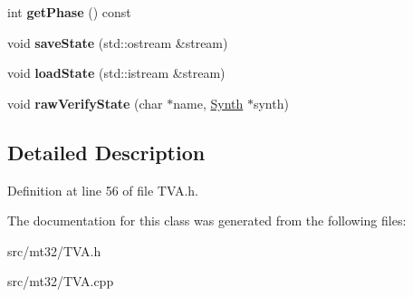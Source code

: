 \begin{DoxyCompactItemize}
\item 
\hypertarget{classMT32Emu_1_1TVA_a273d3a2a8000f47c4e9ee43832e8316a}{int {\bfseries get\-Phase} () const }\label{classMT32Emu_1_1TVA_a273d3a2a8000f47c4e9ee43832e8316a}

\item 
\hypertarget{classMT32Emu_1_1TVA_ad59092d645a1d22ce4d4d4860639a346}{void {\bfseries save\-State} (std\-::ostream \&stream)}\label{classMT32Emu_1_1TVA_ad59092d645a1d22ce4d4d4860639a346}

\item 
\hypertarget{classMT32Emu_1_1TVA_a0329b35f232a3517a1702e88b8c3c696}{void {\bfseries load\-State} (std\-::istream \&stream)}\label{classMT32Emu_1_1TVA_a0329b35f232a3517a1702e88b8c3c696}

\item 
\hypertarget{classMT32Emu_1_1TVA_ab4d75087deb81f3aa794b1709eb107d5}{void {\bfseries raw\-Verify\-State} (char $\ast$name, \hyperlink{classMT32Emu_1_1Synth}{Synth} $\ast$synth)}\label{classMT32Emu_1_1TVA_ab4d75087deb81f3aa794b1709eb107d5}

\end{DoxyCompactItemize}


\subsection{Detailed Description}


Definition at line 56 of file T\-V\-A.\-h.



The documentation for this class was generated from the following files\-:\begin{DoxyCompactItemize}
\item 
src/mt32/T\-V\-A.\-h\item 
src/mt32/T\-V\-A.\-cpp\end{DoxyCompactItemize}
